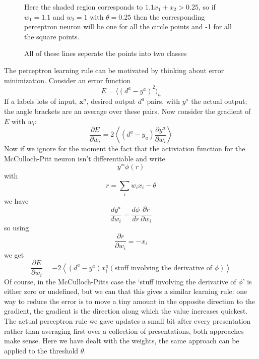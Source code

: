 \documentclass[12pt]{article}
\begin{document}
\begin{figure}

\caption{Here the shaded region corresponds to $1.1x_1+x_2>0.25$, so
  if $w_1=1.1$ and $w_2=1$ with $\theta=0.25$ then the corresponding
  perceptron neuron will be one for all the circle points and -1 for
  all the square points.\label{fig:linear_classifier}}
\end{figure}


\begin{figure}

\caption{All of these lines seperate the points into two classes\label{fig:random_points}}
\end{figure}

The perceptron learning rule can be motivated by thinking about error
minimization. Consider an error function
\begin{equation}
E=\langle(d^a-y^a)^2\rangle_a
\end{equation}
If $a$ labels lots of input, $\textbf{x}^a$, desired output $d^a$
pairs, with $y^a$ the actual output; the angle brackets are an average
over these pairs. Now consider the gradient of $E$ with $w_{i}$:
\begin{equation}
\frac{\partial E}{\partial w_{i}}=2\left\langle (d^a-y_a) \frac{\partial y^a}{\partial w_{i}}\right\rangle
\end{equation}
Now if we ignore for the moment the fact that the activiation function for the McCulloch-Pitt neuron isn't differentiable and write
\begin{equation}
y^=\phi(r)
\end{equation}
with 
\begin{equation}
r=\sum_{i}w_i x_i-\theta
\end{equation}
we have
\begin{equation}
\frac{dy^a}{dw_i}=\frac{d\phi}{dr}\frac{\partial r}{\partial w_i}
\end{equation}
so using
\begin{equation}
\frac{\partial r}{\partial w_i}=-x_i
\end{equation}
we get
\begin{equation}
\frac{\partial E}{\partial w_{i}}=-2\left\langle (d^a-y^a)x^a_i (\mbox{stuff involving the derivative of }\phi)\right\rangle
\end{equation}
Of course, in the McCulloch-Pitts case the \lq{}stuff involving the
derivative of $\phi$\rq{} is either zero or undefined, but we can that
this gives a similar learning rule: one way to reduce the error is to
move a tiny amount in the opposite direction to the gradient, the
gradient is the direction along which the value increases
quickest. The actual perceptron rule we gave updates a small bit after
every presentation rather than averaging first over a collection of
presentations, both approaches make sense. Here we have dealt with the
weights, the same approach can be applied to the threshold $\theta$.
\end{document}
